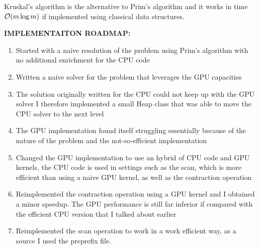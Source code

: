 \documentclass[a4paper,10pt]{article}
\begin{document}
Kruskal's algorithm is the alternative to Prim's algorithm and it works in time $\mathcal{O}(m\log{m})$ if implemented using classical data structures.

\bigskip

\noindent
{}
\makeatletter\def\@currentlabel{\texttt{(I)}}\makeatother
\label{sec:intro}
\textbf{IMPLEMENTAITON ROADMAP:}
\\
\begin{enumerate}
	\item Started with a naive resolution of the problem using Prim's algorithm with no additional enrichment for the CPU code
	\item Written a naive solver for the problem that leverages the GPU capacities
	\item The solution originally written for the CPU could not keep up with the GPU solver I therefore implemented a small Heap class that was able to move the CPU solver to the next level
	\item The GPU implementation found itself struggling essentially because of the nature of the problem and the not-so-efficient implementation
	\item Changed the GPU implementation to use an hybrid of CPU code and GPU kernels, the CPU code is used in settings such as the scan, which is more efficient than using a naive GPU kernel, as well as the contraction operation
	\item Reimplemented the contraction operation using a GPU kernel and I obtained a minor speedup. The GPU performance is still far inferior if compared with the efficient CPU version that I talked about earlier
	\item Reimplemented the scan operation to work in a work efficient way, as a source I used the preprefix file.
\end{enumerate}

\clearpage

\printbibliography
\end{document}
